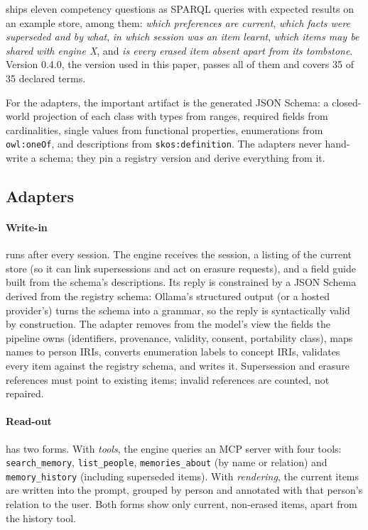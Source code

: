 \memcore ships eleven competency questions as SPARQL queries with expected results on an example
store, among them: \emph{which preferences are current}, \emph{which facts were superseded and by
what}, \emph{in which session was an item learnt}, \emph{which items may be shared with engine
X}, and \emph{is every erased item absent apart from its tombstone}. Version 0.4.0, the version
used in this paper, passes all of them and covers 35 of 35 declared terms.

For the adapters, the important artifact is the generated JSON Schema: a closed-world projection
of each class with types from ranges, required fields from cardinalities, single values from
functional properties, enumerations from \texttt{owl:oneOf}, and descriptions from
\texttt{skos:definition}. The adapters never hand-write a schema; they pin a registry version and
derive everything from it.

\subsection{Adapters}\label{sec:adapters}

\paragraph{Write-in} runs after every session. The engine receives the session, a listing of the
current store (so it can link supersessions and act on erasure requests), and a field guide built
from the schema's descriptions. Its reply is constrained by a JSON Schema derived from the
registry schema: Ollama's structured output (or a hosted provider's) turns the schema into a
grammar, so the reply is syntactically valid by construction. The adapter removes from the model's view the fields the
pipeline owns (identifiers, provenance, validity, consent, portability class), maps names to
person IRIs, converts enumeration labels to concept IRIs, validates every item against the
registry schema, and writes it. Supersession and erasure references must point to existing
items; invalid references are counted, not repaired.

\paragraph{Read-out} has two forms. With \emph{tools}, the engine queries an MCP server with
four tools: \texttt{search\_memory}, \texttt{list\_people}, \texttt{memories\_about} (by name or
relation) and \texttt{memory\_history} (including superseded items). With \emph{rendering}, the
current items are written into the prompt, grouped by person and annotated with that person's
relation to the user. Both forms show only current, non-erased items, apart from the history tool.

